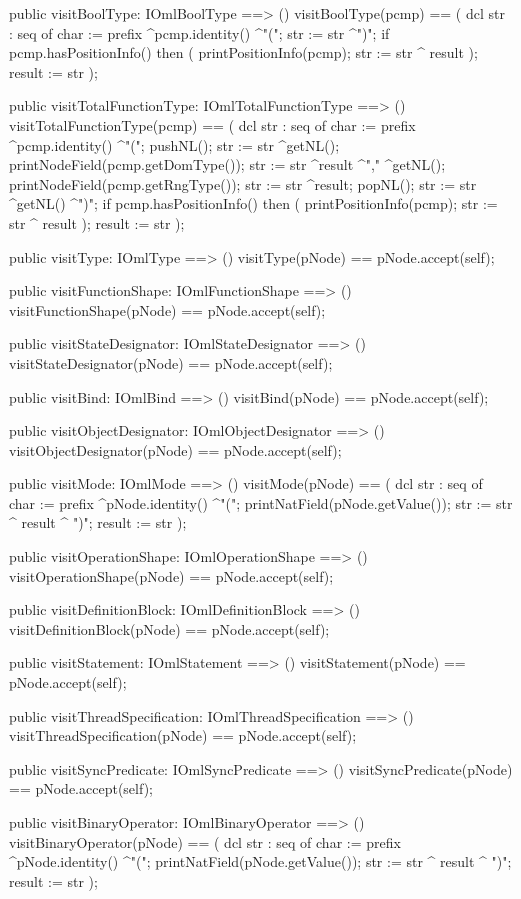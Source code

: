 \begin{vdm_al}
  public visitBoolType: IOmlBoolType ==> ()
  visitBoolType(pcmp) ==
    ( dcl str : seq of char := prefix ^pcmp.identity() ^"(";
      str := str ^")";
      if pcmp.hasPositionInfo()
      then ( printPositionInfo(pcmp);
             str := str ^ result );
      result := str );

  public visitTotalFunctionType: IOmlTotalFunctionType ==> ()
  visitTotalFunctionType(pcmp) ==
    ( dcl str : seq of char := prefix ^pcmp.identity() ^"(";
      pushNL();
      str := str ^getNL();
      printNodeField(pcmp.getDomType());
      str := str ^result ^"," ^getNL();
      printNodeField(pcmp.getRngType());
      str := str ^result;
      popNL();
      str := str ^getNL() ^")";
      if pcmp.hasPositionInfo()
      then ( printPositionInfo(pcmp);
             str := str ^ result );
      result := str );

  public visitType: IOmlType ==> ()
  visitType(pNode) == pNode.accept(self);

  public visitFunctionShape: IOmlFunctionShape ==> ()
  visitFunctionShape(pNode) == pNode.accept(self);

  public visitStateDesignator: IOmlStateDesignator ==> ()
  visitStateDesignator(pNode) == pNode.accept(self);

  public visitBind: IOmlBind ==> ()
  visitBind(pNode) == pNode.accept(self);

  public visitObjectDesignator: IOmlObjectDesignator ==> ()
  visitObjectDesignator(pNode) == pNode.accept(self);

  public visitMode: IOmlMode ==> ()
  visitMode(pNode) == 
    ( dcl str : seq of char := prefix ^pNode.identity() ^"(";
      printNatField(pNode.getValue());
      str := str ^ result ^ ")";
      result := str );

  public visitOperationShape: IOmlOperationShape ==> ()
  visitOperationShape(pNode) == pNode.accept(self);

  public visitDefinitionBlock: IOmlDefinitionBlock ==> ()
  visitDefinitionBlock(pNode) == pNode.accept(self);

  public visitStatement: IOmlStatement ==> ()
  visitStatement(pNode) == pNode.accept(self);

  public visitThreadSpecification: IOmlThreadSpecification ==> ()
  visitThreadSpecification(pNode) == pNode.accept(self);

  public visitSyncPredicate: IOmlSyncPredicate ==> ()
  visitSyncPredicate(pNode) == pNode.accept(self);

  public visitBinaryOperator: IOmlBinaryOperator ==> ()
  visitBinaryOperator(pNode) == 
    ( dcl str : seq of char := prefix ^pNode.identity() ^"(";
      printNatField(pNode.getValue());
      str := str ^ result ^ ")";
      result := str );


\end{vdm_al}
